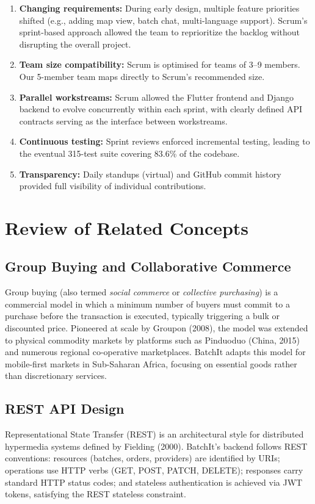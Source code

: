 \documentclass[12pt, a4paper]{report}
\begin{document}
\begin{enumerate}[leftmargin=*, label=\textcolor{batchitGreen}{\textbf{\arabic*.}}]
  \item \textbf{Changing requirements:} During early design, multiple feature priorities shifted (e.g., adding map view, batch chat, multi-language support). Scrum's sprint-based approach allowed the team to reprioritize the backlog without disrupting the overall project.
  \item \textbf{Team size compatibility:} Scrum is optimised for teams of 3--9 members. Our 5-member team maps directly to Scrum's recommended size.
  \item \textbf{Parallel workstreams:} Scrum allowed the Flutter frontend and Django backend to evolve concurrently within each sprint, with clearly defined API contracts serving as the interface between workstreams.
  \item \textbf{Continuous testing:} Sprint reviews enforced incremental testing, leading to the eventual 315-test suite covering 83.6\% of the codebase.
  \item \textbf{Transparency:} Daily standups (virtual) and GitHub commit history provided full visibility of individual contributions.
\end{enumerate}

\section{Review of Related Concepts}

\subsection{Group Buying and Collaborative Commerce}
Group buying (also termed \textit{social commerce} or \textit{collective purchasing}) is a commercial model in which a minimum number of buyers must commit to a purchase before the transaction is executed, typically triggering a bulk or discounted price. Pioneered at scale by Groupon (2008), the model was extended to physical commodity markets by platforms such as Pinduoduo (China, 2015) and numerous regional co-operative marketplaces. BatchIt adapts this model for mobile-first markets in Sub-Saharan Africa, focusing on essential goods rather than discretionary services.

\subsection{REST API Design}
Representational State Transfer (REST) is an architectural style for distributed hypermedia systems defined by Fielding (2000). BatchIt's backend follows REST conventions: resources (batches, orders, providers) are identified by URIs; operations use HTTP verbs (GET, POST, PATCH, DELETE); responses carry standard HTTP status codes; and stateless authentication is achieved via JWT tokens, satisfying the REST stateless constraint.
\end{document}

